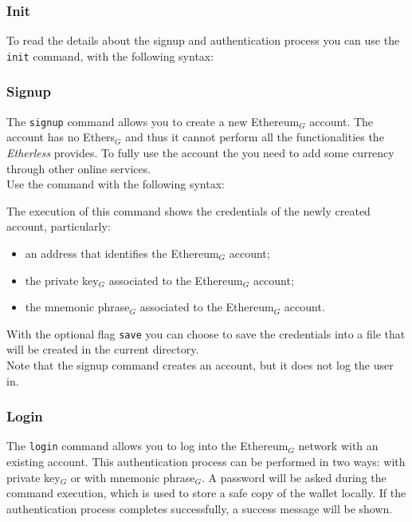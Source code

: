 \subsubsection{Init}
To read the details about the signup and authentication process you can use the \texttt{init} command, with the following syntax:
\begin{center}
\end{center}

\subsubsection{Signup}
The \texttt{signup} command allows you to create a new Ethereum$_{G}$ account. The account has no Ethers$_{G}$ and thus it cannot perform all the functionalities the \textit{Etherless} provides.
To fully use the account the you need to add some currency through other online services. \\
Use the command with the following syntax:

\begin{center}
\end{center}

\noindent The execution of this command shows the credentials of the newly created account, particularly:
\begin{itemize}
	\item an address that identifies the Ethereum$_{G}$ account;
	\item the private key$_{G}$ associated to the Ethereum$_{G}$ account;
	\item the mnemonic phrase$_{G}$ associated to the Ethereum$_{G}$ account.
\end{itemize}
With the optional flag \texttt{save} you can choose to save the credentials into a file that will be created in the current directory. \\
Note that the signup command creates an account, but it does not log the user in.

\subsubsection{Login}
The \texttt{login} command allows you to log into the Ethereum$_{G}$ network with an existing account.
This authentication process can be performed in two ways: with private key$_{G}$ or with mnemonic phrase$_{G}$.
A password will be asked during the command execution, which is used to store a safe copy of the wallet locally. If the authentication process completes successfully, a success message will be shown.

